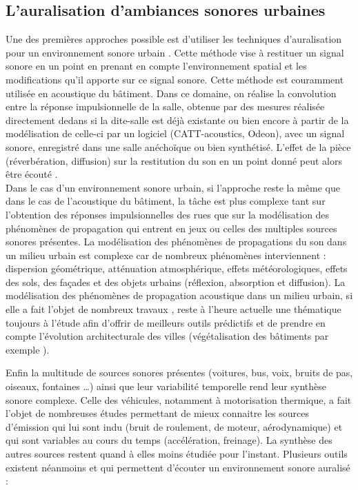\subsection{L'auralisation d'ambiances sonores urbaines}
Une des premières approches possible est d'utiliser les techniques d'auralisation pour un environnement sonore urbain \cite{forssen2009auralization}. Cette méthode vise à restituer un signal sonore en un point en prenant en compte l'environnement spatial et les modifications qu'il apporte sur ce signal sonore. Cette méthode est couramment utilisée en acoustique du bâtiment. Dans ce domaine, on réalise la convolution entre la réponse impulsionnelle de la salle, obtenue par des mesures réalisée directement dedans si la dite-salle est déjà existante ou bien encore à partir de la modélisation de celle-ci par un logiciel (CATT-acoustics, Odeon), avec un signal sonore, enregistré dans une salle anéchoïque ou bien synthétisé. L'effet de la pièce (réverbération, diffusion) sur la restitution du son en un point donné peut alors être écouté \cite{vorlander2007auralization}.\\

Dans le cas d'un environnement sonore urbain, si l'approche reste la même que dans le cas de l'acoustique du bâtiment, la tâche est plus complexe tant sur l'obtention des réponses impulsionnelles des rues que sur la modélisation des phénomènes de propagation qui entrent en jeux ou celles des multiples sources sonores présentes. La modélisation des phénomènes de propagations du son dans un milieu urbain est complexe car de nombreux phénomènes interviennent : dispersion géométrique, atténuation atmosphérique, effets météorologiques, effets des sols, des façades et des objets urbains (réflexion, absorption et diffusion). La modélisation des phénomènes de propagation acoustique dans un milieu urbain, si elle a fait l'objet de nombreux travaux \cite{embleton1976outdoor} \cite{lihoreau2006outdoor}, reste à l'heure actuelle une thématique toujours à l'étude afin d'offrir de meilleurs outils prédictifs \cite{leroy_uncertainty_2010}  \cite{guillaume_numerical_2015} et de prendre en compte l'évolution architecturale des villes (végétalisation des bâtiments par exemple \cite{guillaume:hal-01061125}). 

Enfin la multitude de sources sonores présentes (voitures, bus, voix, bruits de pas, oiseaux, fontaines \dots) ainsi que leur variabilité temporelle rend leur synthèse sonore complexe. Celle des véhicules, notamment à motorisation thermique, a fait l'objet de nombreuses études permettant de mieux connaitre les sources d'émission qui lui sont indu (bruit de roulement, de moteur, aérodynamique) et qui sont variables au cours du temps (accélération, freinage). La synthèse des autres sources restent quand à elles moins étudiée pour l'instant.
Plusieurs outils existent néanmoins et qui permettent d'écouter un environnement sonore auralisé : 

